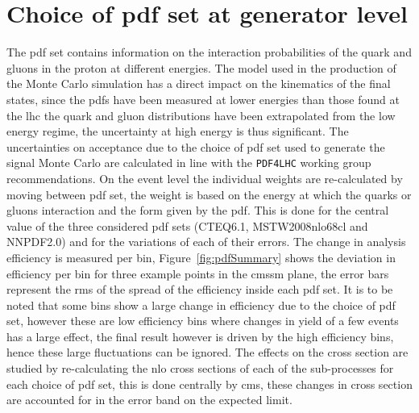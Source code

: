 \section{Choice of \ac{pdf} set at generator level} %
\label{sub:choice_of_pdf_set_at_generator_level_}
The \ac{pdf} set contains information on the interaction probabilities of the 
quark and gluons in the proton at different energies. The model used in the 
production of the Monte Carlo simulation has a direct impact on the kinematics 
of the final states, since the \ac{pdf}s have been measured at lower energies 
than those found at the \ac{lhc} the quark and gluon distributions have been 
extrapolated from the low energy regime, the uncertainty at high energy is thus 
significant.
The uncertainties on acceptance due to the choice of \ac{pdf} set used to 
generate the signal Monte Carlo are calculated in line with the 
\texttt{PDF4LHC}\cite{pdf4lhc} working group recommendations. On the event 
level the individual weights are re-calculated by moving between \ac{pdf} set, 
the weight is based on the energy at which the quarks or gluons interaction and 
the form given by the \ac{pdf}. This is done for the central value of the three 
considered \ac{pdf} sets (CTEQ6.1\cite{cteq6.1}, MSTW2008nlo68cl\cite{MSTW} and 
NNPDF2.0\cite{NNPDF}) and for the variations of each of their errors. The 
change in analysis efficiency is measured per \HT bin, 
Figure~\ref{fig:pdfSummary} shows the deviation in efficiency per bin for three 
example points in the \ac{cmssm} plane, the error bars represent the \ac{rms} 
of the spread of the efficiency inside each \ac{pdf} set. It is to be noted 
that some bins show a large change in efficiency due to the choice of \ac{pdf} 
set, however these are low efficiency bins where changes in yield of a few 
events has a large effect, the final result however is driven by the high 
efficiency bins, hence these large fluctuations can be ignored. The effects on 
the cross section are studied by re-calculating the \ac{nlo} cross sections of 
each of the sub-processes for each choice of \ac{pdf} set, this is done 
centrally by \ac{cms}, these changes in cross section are accounted for in the 
error band on the expected limit.

